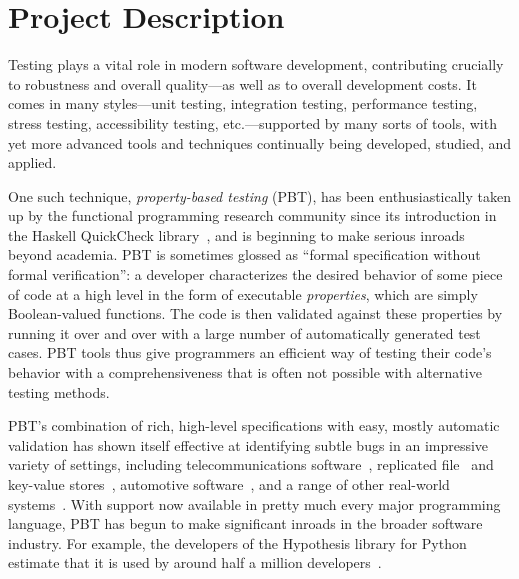 \section*{Project Description}





Testing plays a vital role in modern software development,
contributing crucially to robustness and overall quality---as well as
to overall development costs.
%
It comes in many styles---unit testing, integration testing,
performance testing, stress testing, accessibility testing,
etc.---supported by many sorts of tools, with yet more advanced tools
and techniques continually being developed, studied, and applied.

One such technique, {\em property-based testing} (PBT), has been
enthusiastically taken up by the functional programming research
community since its introduction in the Haskell QuickCheck
library~\cite{ClaessenHughes00}, and is beginning to make
serious inroads beyond academia.
%
PBT is sometimes glossed as ``formal specification without formal
verification'': a developer characterizes the desired behavior of
some piece of code at a high level in the form of executable {\em
  properties}, which are simply Boolean-valued functions. The code is
then validated against these properties by running it over and over
with a large number of automatically generated test cases.
%
PBT tools thus give programmers an efficient way of testing their
code's behavior with a comprehensiveness that is often not
possible with alternative testing methods.

PBT's combination of rich, high-level specifications with easy, mostly
automatic validation has shown itself effective at identifying subtle
bugs in an impressive variety of settings, including telecommunications
software~\cite{arts2006testing}, replicated
file~\cite{hughes2014mysteries} and key-value
stores~\cite{Bornholt2021}, automotive software~\cite{arts2015testing}, and a range
of other real-world systems~\cite{hughes2016experiences}. With support
now available in pretty much every major programming language, PBT has
begun to make significant inroads in the broader software
industry. For example, the developers of the Hypothesis library for
Python estimate that it is used by around half a million
developers~\cite{ZacPersonalCommunication}.

